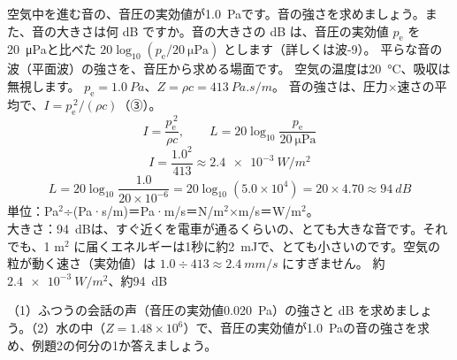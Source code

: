 \label{ph:波-7:ex2}
\begin{phreidai}[音圧と音の強さ]
空気中を進む音の、音圧の実効値が\qty{1.0}{Pa}です。音の強さを求めましょう。また、音の大きさは何 dB ですか。音の大きさの dB は、音圧の実効値 $p_{\mathrm e}$ を\qty{20}{\micro\pascal}と比べた $20\log_{10}(p_{\mathrm e}/\qty{20}{\micro\pascal})$ とします（詳しくは波-9）。
\phbamen
平らな音の波（平面波）の強さを、音圧から求める場面です。
\phmushi
空気の温度は\qty{20}{\celsius}、吸収は無視します。
\phzu
$p_{\mathrm e}=\qty{1.0}{Pa}$、$Z=\rho c=\qty{413}{Pa.s/m}$。
\phriyu
音の強さは、圧力×速さの平均で、$I=p_{\mathrm e}^{\,2}/(\rho c)$（③）。
\phtateru
\[I=\frac{p_{\mathrm e}^{\,2}}{\rho c},\qquad L=20\log_{10}\frac{p_{\mathrm e}}{\qty{20}{\micro\pascal}}\]
\phtoku
\[I=\frac{1.0^2}{413}\approx\qty{2.4e-3}{W/m^2}\]
\[L=20\log_{10}\frac{1.0}{20\times10^{-6}}=20\log_{10}(5.0\times10^4)=20\times4.70\approx\qty{94}{dB}\]
\phtashikame
単位：Pa$^2$÷(Pa·s/m)＝Pa·m/s＝N/m$^2$×m/s＝W/m$^2$。\\
大きさ：\qty{94}{dB}は、すぐ近くを電車が通るくらいの、とても大きな音です。それでも、1 m$^2$ に届くエネルギーは1秒に約\qty{2}{mJ}で、とても小さいのです。空気の粒が動く速さ（実効値）は $1.0\div413\approx\qty{2.4}{mm/s}$ にすぎません。
\kotae 約 $\qty{2.4e-3}{W/m^2}$、約\qty{94}{dB}
\end{phreidai}
\begin{jibun}
（1）ふつうの会話の声（音圧の実効値\qty{0.020}{Pa}）の強さと dB を求めましょう。（2）水の中（$Z=1.48\times10^6$）で、音圧の実効値が\qty{1.0}{Pa}の音の強さを求め、例題2の何分の1か答えましょう。
\end{jibun}


